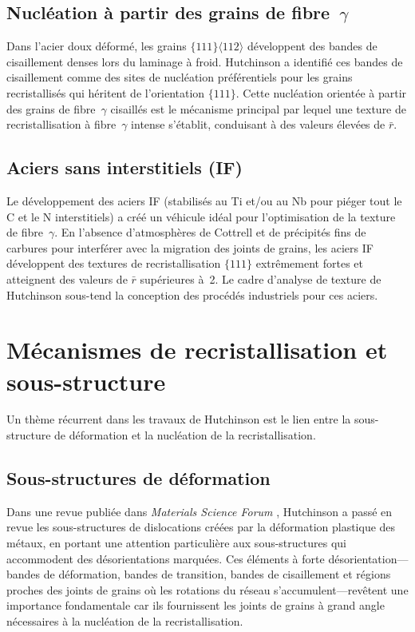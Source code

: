 \documentclass[11pt,a4paper]{article}
\begin{document}
\subsection{Nucl\'eation \`a partir des grains de fibre~$\gamma$}

Dans l'acier doux d\'eform\'e, les grains
$\{111\}\langle 112\rangle$ d\'eveloppent des bandes de cisaillement
denses lors du laminage \`a froid.  Hutchinson a identifi\'e ces bandes
de cisaillement comme des sites de nucl\'eation pr\'ef\'erentiels pour
les grains recristallis\'es qui h\'eritent de l'orientation $\{111\}$.
Cette \og nucl\'eation orient\'ee \fg{} \`a partir des grains de
fibre~$\gamma$ cisaill\'es est le m\'ecanisme principal par lequel une
texture de recristallisation \`a fibre~$\gamma$ intense s'\'etablit,
conduisant \`a des valeurs \'elev\'ees de $\bar{r}$.

\subsection{Aciers sans interstitiels (IF)}

Le d\'eveloppement des aciers IF (stabilis\'es au Ti et/ou au Nb pour
pi\'eger tout le C et le N interstitiels) a cr\'e\'e un v\'ehicule
id\'eal pour l'optimisation de la texture de fibre~$\gamma$.  En
l'absence d'atmosph\`eres de Cottrell et de pr\'ecipit\'es fins de
carbures pour interf\'erer avec la migration des joints de grains, les
aciers IF d\'eveloppent des textures de recristallisation $\{111\}$
extr\^emement fortes et atteignent des valeurs de $\bar{r}$
sup\'erieures \`a~2.  Le cadre d'analyse de texture de Hutchinson
sous-tend la conception des proc\'ed\'es industriels pour ces aciers.

\section{M\'ecanismes de recristallisation et sous-structure}
\label{sec:rex}

Un th\`eme r\'ecurrent dans les travaux de Hutchinson est le lien entre
la sous-structure de d\'eformation et la nucl\'eation de la
recristallisation.

\subsection{Sous-structures de d\'eformation}

Dans une revue publi\'ee dans \emph{Materials Science Forum}
\cite{Hutchinson2007MSF}, Hutchinson a pass\'e en revue les
sous-structures de dislocations cr\'e\'ees par la d\'eformation
plastique des m\'etaux, en portant une attention particuli\`ere aux
sous-structures qui accommodent des d\'esorientations marqu\'ees.  Ces
\'el\'ements \`a forte d\'esorientation---bandes de d\'eformation,
bandes de transition, bandes de cisaillement et r\'egions proches des
joints de grains o\`u les rotations du r\'eseau s'accumulent---rev\^etent
une importance fondamentale car ils fournissent les joints de grains \`a
grand angle n\'ecessaires \`a la nucl\'eation de la recristallisation.
\end{document}
